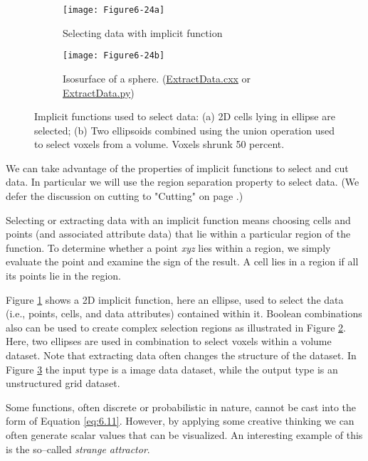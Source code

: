 \begin{description}[leftmargin=0cm,labelindent=0cm]
\begin{figure}[htb]
	\begin{subfigure}[h]{0.48\linewidth}
		\texttt{[image: Figure6-24a]}
		\caption{Selecting data with implicit function}
		\label{fig:Figure6-24a}
	\end{subfigure}
	\hfill
	\begin{subfigure}[h]{0.48\linewidth}
		\texttt{[image: Figure6-24b]}
		\caption{Isosurface of a sphere. (\href{https://lorensen.github.io/VTKExamples/site/Cxx/VisualizationAlgorithms/ExtractData}{ExtractData.cxx} or \href{https://lorensen.github.io/VTKExamples/site/Python/VisualizationAlgorithms/ExtractData/}{ExtractData.py})}
		\label{fig:Figure6-24b}
	\end{subfigure}
	\caption{Implicit functions used to select data: (a) 2D cells lying in ellipse are selected; (b) Two ellipsoids combined using the union operation used to select voxels from a volume. Voxels shrunk 50 percent.}\label{fig:Figure6-24}
\end{figure}

\item[Selecting Data.] We can take advantage of the properties of implicit functions to select and cut data. In particular we will use the region separation property to select data. (We defer the discussion on cutting to "Cutting" on page \pageref{subsec:cutting}.)

Selecting or extracting data with an implicit function means choosing cells and points (and associated attribute data) that lie within a particular region of the function. To determine whether a point \emph{xyz} lies within a region, we simply evaluate the point and examine the sign of the result. A cell lies in a region if all its points lie in the region.

Figure \ref{fig:Figure6-24a} shows a 2D implicit function, here an ellipse, used to select the data (i.e., points, cells, and data attributes) contained within it. Boolean combinations also can be used to create complex selection regions as illustrated in Figure \ref{fig:Figure6-24b}. Here, two ellipses are used in combination to select voxels within a volume dataset. Note that extracting data often changes the structure of the dataset. In Figure \ref{fig:Figure6-24} the input type is a image data dataset, while the output type is an unstructured grid dataset.

\item[Visualizing Mathematical Descriptions.] Some functions, often discrete or probabilistic in nature, cannot be cast into the form of Equation \ref{eq:6.11}. However, by applying some creative thinking we can often generate scalar values that can be visualized. An interesting example of this is the so--called \emph{strange attractor}.


\end{description}
